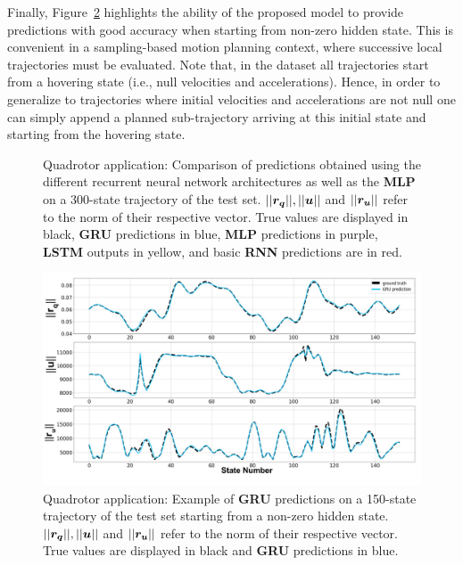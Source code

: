 Finally, Figure~\ref{fig:non_zero_hidden} highlights the ability of the proposed model to provide predictions with good accuracy when starting from non-zero hidden state. 
This is convenient in a sampling-based motion planning context, where successive local trajectories must be evaluated.
Note that, in the dataset all trajectories start from a hovering state (i.e., null velocities and accelerations). 
Hence, in order to generalize to trajectories where initial velocities and accelerations are not null one can simply append a planned sub-trajectory arriving at this initial state and starting from the hovering state.

\begin{figure}[h!]
    \centering
     
    \caption{Quadrotor application: Comparison of predictions obtained using the different recurrent neural network architectures as well as the \textbf{MLP} on a 300-state trajectory of the test set. $||\boldsymbol{r_q}||, ||\boldsymbol{u}||$ and $||\boldsymbol{r_u}||$ refer to the norm of their respective vector. 
    True values are displayed in black, \textbf{GRU} predictions in blue, \textbf{MLP} predictions in purple, \textbf{LSTM} outputs in yellow, and basic \textbf{RNN} predictions are in red.}
    \label{fig:MLP_pred_val}
\end{figure}

\begin{figure}[h!]
    \centering
    \includegraphics[width=0.9\linewidth]{figures/learning_quadrotor/non_zero_hidden.jpg} 
    \caption{Quadrotor application: Example of \textbf{GRU} predictions on a 150-state trajectory of the test set starting from a non-zero hidden state.
    $||\boldsymbol{r_q}||, ||\boldsymbol{u}||$ and $||\boldsymbol{r_u}||$ refer to the norm of their respective vector. 
    True values are displayed in black and \textbf{GRU} predictions in blue.}
    \label{fig:non_zero_hidden}
\end{figure}

